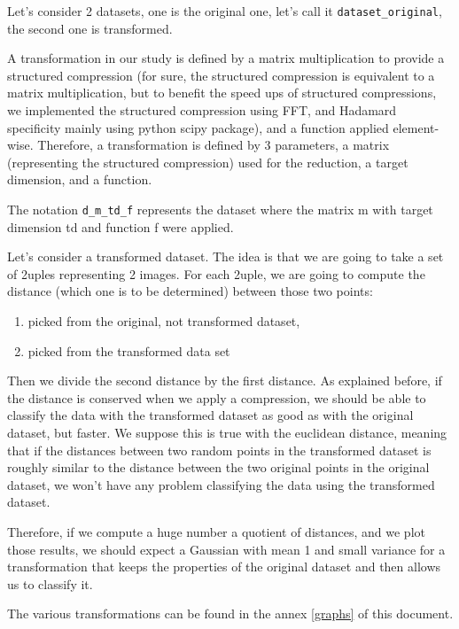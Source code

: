 \documentclass[11pt,a4paper]{article}
\begin{document}
	
	Let's consider 2 datasets, one is the original one, let's call it \texttt{dataset\_original}, the second one is transformed.
	
		A transformation in our study is defined by a matrix multiplication to provide a structured compression (for sure, the structured compression is equivalent to a matrix multiplication, but to benefit the speed ups of structured compressions, we implemented the structured compression using FFT, and Hadamard specificity mainly using python scipy package), and a function applied element-wise. Therefore, a transformation is defined by 3 parameters, a matrix (representing the structured compression) used for the reduction, a target dimension, and a function.
		
		
	The notation \texttt{d\_m\_td\_f} represents the dataset where the matrix m with target dimension td and function f were applied.
	
	Let's consider a transformed dataset. The idea is that we are going to take a set of 2uples representing 2 images. For each 2uple, we are going to compute the distance (which one is to be determined) between those two points:
	
	\begin{enumerate}
		\item picked from the original, not transformed dataset,
		\item picked from the transformed data set
	\end{enumerate}


	
	
	Then we divide the second distance by the first distance. As explained before, if the distance is conserved when we apply a compression, we should be able to classify the data with the transformed dataset as good as with the original dataset, but faster. We suppose this is true with the euclidean distance, meaning that if the distances between two random points in the transformed dataset is roughly similar to the distance between the two original points in the original dataset, we won't have any problem classifying the data using the transformed dataset.
	
	
	Therefore, if we compute a huge number a quotient of distances, and we plot those results, we should expect a Gaussian with mean 1 and small variance for a transformation that keeps the properties of the original dataset and then allows us to classify it.
	
	The various transformations can be found in the annex \ref{graphs} of this document.
	
\end{document}

